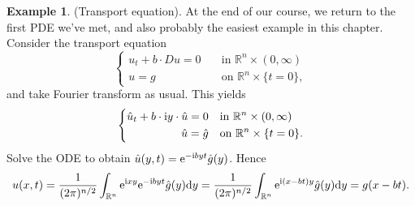 \documentclass[hyperref,UTF8,12pt]{article}
\numberwithin{equation}{subsection}
\theoremstyle{plain}
\theoremstyle{definition}
\newtheorem{example}{Example}
\numberwithin{theorem}{section}
\numberwithin{lemma}{section}
\numberwithin{proposition}{section}
\numberwithin{remark}{section}
\numberwithin{corollary}{section}
\numberwithin{definition}{section}
\numberwithin{problem}{section}
\numberwithin{example}{section}
\def\e{\textup{e}}
\def\i{\textup{i}}
\def\dif{\textup{d}}
\newcommand{\mr}{\mathbb{R}}
\begin{document}
\begin{example}
(Transport equation). At the end of our course, we return to the first PDE we've met, and also probably the easiest example in this chapter. Consider the transport equation\[
\left\{\begin{aligned}
	u_t+b\cdot Du=0&\quad\text{in } \mr^n\times(0,\infty)\\
	u=g&\quad\text{on } \mr^n\times\{t=0\},
\end{aligned}\right.\]and take Fourier transform as usual. This yields \[\left\{\begin{aligned}
\hat{u}_t+b\cdot\i y\cdot\hat{u}=0&\quad\text{in } \mr^n\times(0,\infty)\\
\hat{u}=\hat{g}&\quad\text{on } \mr^n\times\{t=0\}.
\end{aligned}\right.\]Solve the ODE to obtain $\hat{u}(y,t)=\e^{-\i byt}\hat{g}(y)$. Hence \[u(x,t)=\frac{1}{(2\pi)^{n/2}}\int_{\mr^n}\e^{\i xy}\e^{-\i byt}\hat{g}(y)\dif y= \frac{1}{(2\pi)^{n/2}}\int_{\mr^n}\e^{\i(x-bt)y}\hat{g}(y)\dif y=g(x-bt).\]
\end{example}
\end{document}
